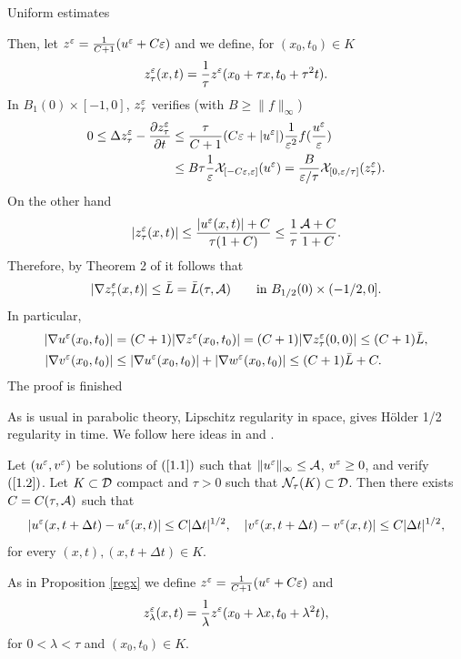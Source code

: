 \begin{section}{Uniform estimates}
\begin{pf}
Then, let $z^{\varepsilon}=\frac{1}{C+1}(u^{\varepsilon}+C\varepsilon)$ and we define, for 
$(x_0,t_0)\in K$
$$z^{\varepsilon}_{\tau}(x,t)=\frac{1}{\tau}z^{\varepsilon}(x_0+\tau x,t_0+\tau^2 t).$$
In $B_1(0)\times [-1,0]$, $z^{\varepsilon}_{\tau}$ verifies  (with $B\ge \|f\|_\infty$)
\begin{align*}
0\le\Delta z^{\varepsilon}_{\tau}-\frac{\partial z^{\varepsilon}_{\tau}}{\partial t}&\le
\frac{\tau}{C+1}(C\varepsilon+|u^{\varepsilon}|)\frac{1}{\varepsilon^2}f(\frac{u^{\varepsilon}}{\varepsilon})\\
&\le B{\tau}\frac{1}{\varepsilon}{\cal X}_{[-C\varepsilon,\varepsilon]}(u^{\varepsilon})=
\frac{B}{\varepsilon/\tau}{\cal X}_{[0,\varepsilon/\tau]}(z^{\varepsilon}_{\tau}).
\end{align*}
On the other hand
$$|z^{\varepsilon}_{\tau}(x,t)|\le\frac{ |u^{\varepsilon}(x,t)|+C}{\tau(1+C)}\le
\frac{1}{\tau}\frac{{\cal A}+C}{1+C}.$$
Therefore, by Theorem 2 of \cite{C} it follows that
$$|\nabla z^{\varepsilon}_{\tau}(x,t)|\le \bar L=\bar L(\tau,{\cal A})\qquad 
\mbox{in } B_{1/2}(0)\times(-1/2,0].$$
In particular,
\begin{align*}
|\nabla u^{\varepsilon}(x_0,t_0)| &=(C+1)|\nabla z^{\varepsilon}(x_0,t_0)|=
(C+1)|\nabla z^{\varepsilon}_{\tau}(0,0)|\le (C+1)\bar L,\\
|\nabla v^{\varepsilon}(x_0,t_0)| &\le|\nabla u^{\varepsilon}(x_0,t_0)|+
|\nabla w^{\varepsilon}(x_0,t_0)|\le (C+1)\bar L+C.
\end{align*}
The proof is finished\end{pf}



As is usual in parabolic theory, Lipschitz regularity in space, gives 
H\"older 1/2 regularity in time. We follow here ideas in \cite{CLW1} and 
\cite{CV}.

\begin{prop}
\label{regt}
Let $(u^{\varepsilon}, v^{\varepsilon})$ be solutions of $(\ref{1.1})$ such that 
$\| u^{\varepsilon} \|_{\infty}\leq {\cal A}$, $v^{\varepsilon}\ge0$, and verify $(\ref{1.2})$. 
Let $K\subset {\cal D}$ compact and $\tau>0$ such that 
${\cal N}_{\tau}(K)\subset {\cal D}$. Then there exists $C=C(\tau,{\cal A})$ 
such that
$$| u^{\varepsilon}(x,t+\Delta t) - u^{\varepsilon}(x,t)|\leq C |\Delta t|^{1/2},\quad
| v^{\varepsilon}(x,t+\Delta t) - v^{\varepsilon}(x,t)|\leq C |\Delta t|^{1/2}, $$
for every $(x,t), (x,t+\Delta t)\in K$.
\end{prop}

\begin{pf}
As in Proposition \ref{regx} we define $z^{\varepsilon}=\frac{1}{C+1}(u^{\varepsilon}+C\varepsilon)$ and
$$z^{\varepsilon}_{\lambda}(x,t)=\frac{1}{\lambda}z^{\varepsilon}(x_0+\lambda x,
t_0+\lambda^2 t),$$
for $0<\lambda<\tau$ and $(x_0,t_0)\in K$.


\end{pf}
\end{section}

